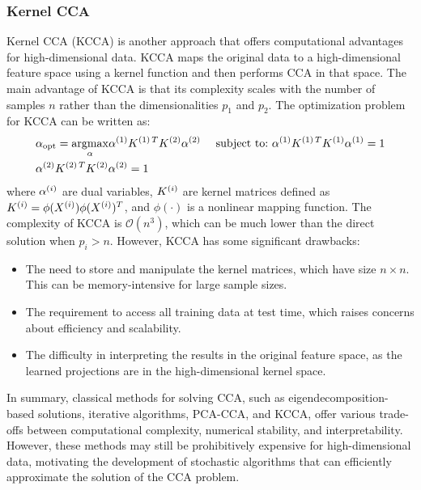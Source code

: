 \subsubsection{Kernel CCA}
Kernel CCA (KCCA) is another approach that offers computational advantages for high-dimensional data. KCCA maps the original data to a high-dimensional feature space using a kernel function and then performs CCA in that space. The main advantage of KCCA is that its complexity scales with the number of samples $n$ rather than the dimensionalities $p_1$ and $p_2$.
The optimization problem for KCCA can be written as:
\begin{align}
& \alpha_{\text{opt}} = \underset{\alpha}{\mathrm{argmax}} { \alpha^{(1)} K^{(1)\,T} K^{(2)} \alpha^{(2)} } \
& \text{subject to:} \notag \
& \alpha^{(1)} K^{(1)\,T} K^{(1)} \alpha^{(1)} = 1 \notag \\
& \alpha^{(2)} K^{(2)\,T} K^{(2)} \alpha^{(2)} = 1 \notag
\end{align}
where $\alpha^{(i)}$ are dual variables, $K^{(i)}$ are kernel matrices defined as $K^{(i)} = \phi(X^{(i)})\phi(X^{(i)})^T$, and $\phi(\cdot)$ is a nonlinear mapping function.
The complexity of KCCA is $\mathcal{O}(n^3)$, which can be much lower than the direct solution when $p_i > n$. However, KCCA has some significant drawbacks:
\begin{itemize}
    \item The need to store and manipulate the kernel matrices, which have size $n \times n$. This can be memory-intensive for large sample sizes.
    \item The requirement to access all training data at test time, which raises concerns about efficiency and scalability.
    \item The difficulty in interpreting the results in the original feature space, as the learned projections are in the high-dimensional kernel space.
\end{itemize}

In summary, classical methods for solving CCA, such as eigendecomposition-based solutions, iterative algorithms, PCA-CCA, and KCCA, offer various trade-offs between computational complexity, numerical stability, and interpretability. However, these methods may still be prohibitively expensive for high-dimensional data, motivating the development of stochastic algorithms that can efficiently approximate the solution of the CCA problem.

